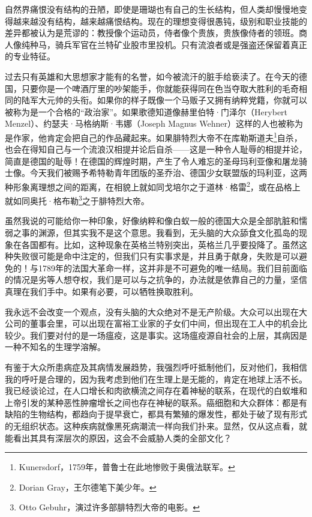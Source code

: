 \documentclass[UTF8]{ctexart}
\begin{document}
自然界痛恨没有结构的丑陋，即使是珊瑚也有自己的生长结构，但人类却慢慢地变得越来越没有结构，越来越痛恨结构。现在的理想变得很愚钝，级别和职业技能的差异都被认为是荒谬的：教授像个运动员，侍者像个贵族，贵族像侍者的领班。商人像纯种马，骑兵军官在兰特矿业股市里投机。只有流浪者或是强盗还保留着真正的专业特征。

过去只有英雄和大思想家才能有的名誉，如今被流汗的脏手给亵渎了。在今天的德国，只要你是一个啤酒厅里的吵架能手，你就能获得同在色当夺取大胜利的毛奇相同的陆军大元帅的头衔。如果你的样子既像一个马贩子又拥有纳粹党籍，你就可以被称为是一个合格的“政治家”。如果歌德知道像赫里伯特·门泽尔（Herybert Menzel）、约瑟夫·马格纳斯·韦娜（Joseph Magnus Wehner）这样的人也被称为是作家，他肯定会把自己的作品藏起来。如果腓特烈大帝不在库勒斯道夫\footnote{Kunersdorf，1759年，普鲁士在此地惨败于奥俄法联军。}自杀，也会在得知自己与一个流浪汉相提并论后自杀——这是一种令人耻辱的相提并论，简直是德国的耻辱！在德国的辉煌时期，产生了令人难忘的圣母玛利亚像和屠龙骑士像。今天我们被赐予希特勒青年团版的圣乔治、德国少女联盟版的玛利亚，这两种形象离理想之间的距离，在相貌上就如同戈培尔之于道林·格雷\footnote{Dorian Gray，王尔德笔下美少年。}，或在品格上就如同奥托·格布勒\footnote{Otto Gebuhr，演过许多部腓特烈大帝的电影。}之于腓特烈大帝。

虽然我说的可能给你一种印象，好像纳粹和像白蚁一般的德国大众是全部肮脏和懦弱之事的渊源，但其实我不是这个意思。我看到，无头脑的大众舔食文化孤岛的现象在各国都有。比如，这种现象在英格兰特别突出，英格兰几乎要投降了。虽然这种失败很可能是命中注定的，但我们只有实事求是，并且勇于献身，失败是可以避免的！与1789年的法国大革命一样，这并非是不可避免的唯一结局。我们目前面临的情况是劣等人想夺权，我们是可以与之抗争的，办法就是依靠自己的力量，坚信真理在我们手中。如果有必要，可以牺牲换取胜利。

我永远不会改变一个观点，没有头脑的大众绝对不是无产阶级。大众可以出现在大公司的董事会里，可以出现在富裕工业家的子女们中间，但出现在工人中的机会比较少。我们要对付的是一场瘟疫，这是事实。这场瘟疫源自社会的上层，其病因是一种不知名的生理学溶解。

有鉴于大众所患病症及其病情发展趋势，我强烈呼吁抵制他们，反对他们，我相信我的呼吁是合理的，因为我考虑到他们在生理上是无能的，肯定在地球上活不长。我已经谈论过，在人口增长和肉欲横流之间存在着神秘的联系，在现代的白蚁堆和上帝引发的某种恶性肿瘤增长之间也存在神秘的联系。癌细胞和大众群体：都是有缺陷的生物结构，都趋向于提早衰亡，都具有繁殖的爆发性，都处于破了现有形式的无组织状态。这种疾病就像黑死病潮流一样向我们扑来。显然，仅从这点看，就能看出其具有深层次的原因，这会不会威胁人类的全部文化？
\end{document}
